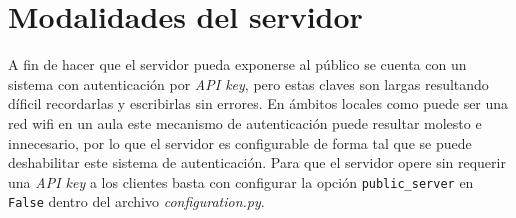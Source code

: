 \section{Modalidades del servidor}

A fin de hacer que el servidor pueda exponerse al público se cuenta con
un sistema con autenticación por \textit{API key}, pero estas claves
son largas resultando díficil recordarlas y escribirlas sin errores. En
ámbitos locales como puede ser una red wifi en un aula este mecanismo
de autenticación puede resultar molesto e innecesario, por lo que el
servidor es configurable de forma tal que se puede deshabilitar este
sistema de autenticación. Para que el servidor opere sin requerir
una \textit{API key} a los clientes basta con configurar la opción
\texttt{public\_server} en \texttt{False} dentro del archivo
\textit{configuration.py}.

